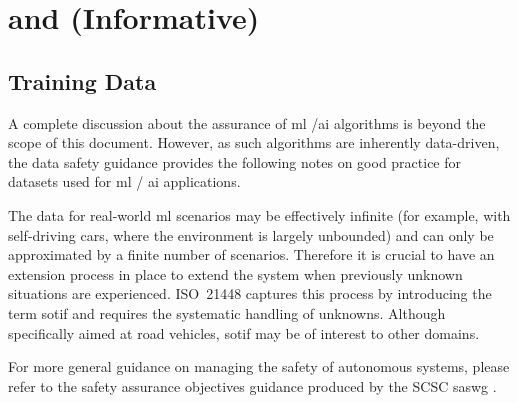 %
%
\section{ and  (Informative)} \label{bkm:MachineLearning}



\subsection{ Training Data}
A complete discussion about the assurance of \gls{ml} /\gls{ai} algorithms is beyond the scope of this document.
However, as such algorithms are inherently data-driven, the data safety guidance provides the following notes on good practice for \glspl{dataset} used for \gls{ml} / \gls{ai} applications.

The data for real-world \gls{ml} scenarios may be effectively infinite (for example, with self-driving cars, where the environment is largely unbounded) and can only be approximated by a finite number of scenarios.
Therefore it is crucial to have an extension process in place to extend the system when previously unknown situations are experienced. 
ISO~21448 \cite{citation:ISO21448} captures this process by introducing the term \gls{sotif} and requires the systematic handling of unknowns. Although specifically aimed at road vehicles, \gls{sotif} may be of interest to other domains.

For more general guidance on managing the safety of autonomous systems, please refer to the safety assurance objectives guidance produced by the SCSC \gls{saswg} \cite{citation:SASWG:Objectives}.

